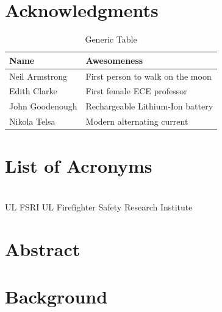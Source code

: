 \documentclass[12pt,oneside]{book}
\begin{document}
\newpage

\chapter*{\centering Acknowledgments}

\begin{table}[!ht]
	\centering
	\caption*{Generic Table}
	\begin{tabular}{ll}
		\toprule[1.5pt]
		Name & Awesomeness \\ 
		\midrule
		Neil Armstrong		 & First person to walk on the moon \\
		Edith Clarke		 & First female ECE professor \\
		John Goodenough		 & Rechargeable Lithium-Ion battery \\
		Nikola Telsa		 & Modern alternating current \\  
		\bottomrule[1.25pt]
	\end{tabular}
\end{table}


\cleardoublepage
{}
{}
\tableofcontents

\cleardoublepage
{}
{}
\listoffigures

\cleardoublepage
{}
{}
\listoftables

\chapter{List of Acronyms}

\begin{tabbing}
\hspace{1.5in} \= \\
UL FSRI \> UL Firefighter Safety Research Institute \\
\end{tabbing}

\newpage

\mainmatter

\chapter*{\centering Abstract}

\newpage

\chapter{Background}
\end{document}

